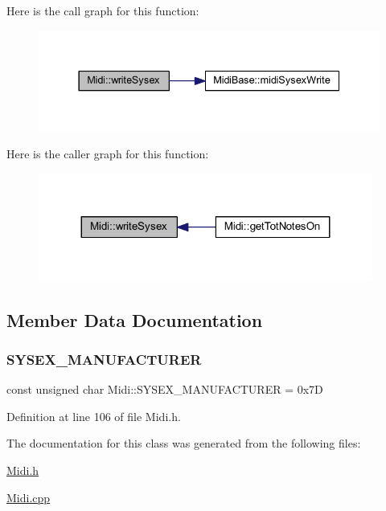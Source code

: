 Here is the call graph for this function\+:
\nopagebreak
\begin{figure}[H]
\begin{center}
\leavevmode
\includegraphics[width=337pt]{da/db9/class_midi_a57efc17c9561b9ca9763d610b4feea9e_cgraph}
\end{center}
\end{figure}
Here is the caller graph for this function\+:
\nopagebreak
\begin{figure}[H]
\begin{center}
\leavevmode
\includegraphics[width=311pt]{da/db9/class_midi_a57efc17c9561b9ca9763d610b4feea9e_icgraph}
\end{center}
\end{figure}


\subsection{Member Data Documentation}
\mbox{\label{class_midi_aa4332beed702e57a3aeb00c0c831b9b0}} 
\subsubsection{\texorpdfstring{S\+Y\+S\+E\+X\+\_\+\+M\+A\+N\+U\+F\+A\+C\+T\+U\+R\+ER}{SYSEX\_MANUFACTURER}}
{\footnotesize\ttfamily const unsigned char Midi\+::\+S\+Y\+S\+E\+X\+\_\+\+M\+A\+N\+U\+F\+A\+C\+T\+U\+R\+ER = 0x7D}



Definition at line 106 of file Midi.\+h.



The documentation for this class was generated from the following files\+:\begin{DoxyCompactItemize}
\item 
\hyperlink{_midi_8h}{Midi.\+h}\item 
\hyperlink{_midi_8cpp}{Midi.\+cpp}\end{DoxyCompactItemize}
